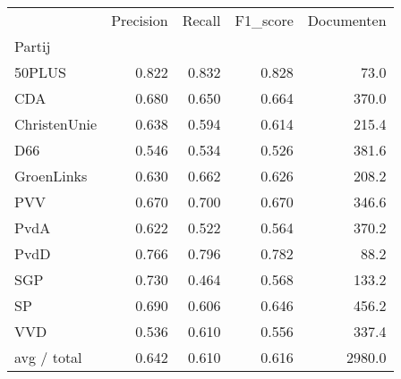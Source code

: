 \begin{tabular}{lrrrr}
\toprule
{} &  Precision &  Recall &  F1\_score &  Documenten \\
Partij       &            &         &           &             \\
\midrule
50PLUS       &      0.822 &   0.832 &     0.828 &        73.0 \\
   CDA       &      0.680 &   0.650 &     0.664 &       370.0 \\
ChristenUnie &      0.638 &   0.594 &     0.614 &       215.4 \\
   D66       &      0.546 &   0.534 &     0.526 &       381.6 \\
  GroenLinks &      0.630 &   0.662 &     0.626 &       208.2 \\
   PVV       &      0.670 &   0.700 &     0.670 &       346.6 \\
  PvdA       &      0.622 &   0.522 &     0.564 &       370.2 \\
  PvdD       &      0.766 &   0.796 &     0.782 &        88.2 \\
   SGP       &      0.730 &   0.464 &     0.568 &       133.2 \\
    SP       &      0.690 &   0.606 &     0.646 &       456.2 \\
   VVD       &      0.536 &   0.610 &     0.556 &       337.4 \\
 avg / total &      0.642 &   0.610 &     0.616 &      2980.0 \\
\bottomrule
\end{tabular}
